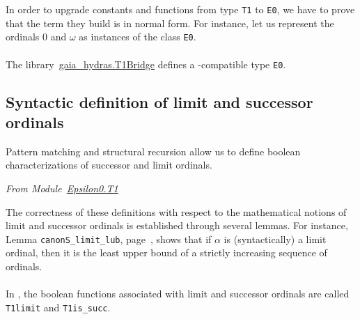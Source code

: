 \vspace{4pt}





In order to  upgrade constants and functions from type \texttt{T1} to \texttt{E0}, we have to prove that
the term they build is in normal form.
For instance, let us represent the ordinals $0$ and $\omega$   as instances of the class \texttt{E0}.

\vspace{4pt}

\label{sect:omega-T1}




\paragraph*{\gaiasign}
 The library~\href{../theories/html/gaia_hydras.T1Bridge.html}{gaia\_hydras.T1Bridge} defines a \gaia-compatible type \texttt{E0}.



\subsection{Syntactic definition of limit and successor ordinals}

Pattern matching and structural recursion allow us to define boolean characterizations  of successor and limit ordinals.


\vspace{4pt}
\noindent
\emph{From Module~\href{../theories/html/hydras.Epsilon0.T1.html\#succb}{Epsilon0.T1}}






The correctness of these definitions with respect to the mathematical notions of
limit and successor ordinals is established through several lemmas. For instance,
Lemma \texttt{canonS\_limit\_lub}, page~\pageref{lemma:canonS-limit}, shows that
if $\alpha$ is (syntactically) a limit ordinal, then it is the least upper bound of
a strictly increasing sequence of ordinals.


\paragraph*{\gaiasign}
In \gaia, the boolean functions associated with limit and successor ordinals are called \texttt{T1limit} and \texttt{T1is\_succ}.

